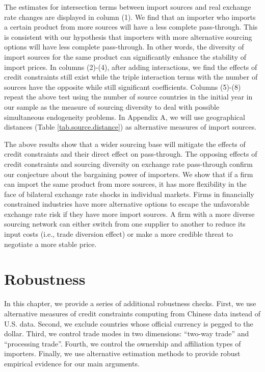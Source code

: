 \documentclass[12pt]{article}
\begin{document}
The estimates for intersection terms between import sources and real exchange rate changes are displayed in column (1). We find that an importer who imports a certain product from more sources will have a less complete pass-through. This is consistent with our hypothesis that importers with more alternative sourcing options will have less complete pass-through. In other words, the diversity of import sources for the same product can significantly enhance the stability of import prices. In columns (2)-(4), after adding interactions, we find the effects of credit constraints still exist while the triple interaction terms with the number of sources have the opposite while still significant coefficients. Columns (5)-(8) repeat the above test using the number of source countries in the initial year in our sample as the measure of sourcing diversity to deal with possible simultaneous endogeneity problems. In Appendix A, we will use geographical distances (Table \ref{tab.source.distance}) as alternative measures of import sources.

The above results show that a wider sourcing base will mitigate the effects of credit constraints and their direct effect on pass-through. The opposing effects of credit constraints and sourcing diversity on exchange rate pass-through confirm our conjecture about the bargaining power of importers. We show that if a firm can import the same product from more sources, it has more flexibility in the face of bilateral exchange rate shocks in individual markets. Firms in financially constrained industries have more alternative options to escape the unfavorable exchange rate risk if they have more import sources. A firm with a more diverse sourcing network can either switch from one supplier to another to reduce its input costs (i.e., trade diversion effect) or make a more credible threat to negotiate a more stable price.

\section{Robustness} \label{Robustness}

In this chapter, we provide a series of additional robustness checks. First, we use alternative measures of credit constraints computing from Chinese data instead of U.S. data. Second, we exclude countries whose official currency is pegged to the dollar. Third, we control trade modes in two dimensions: ``two-way trade'' and ``processing trade''. Fourth, we control the ownership and affiliation types of importers. Finally, we use alternative estimation methods to provide robust empirical evidence for our main arguments.
\end{document}

